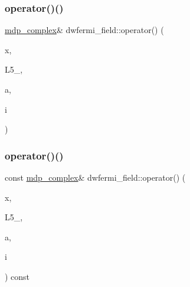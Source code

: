 \mbox{\label{classdwfermi__field_ac0d1e75f5248ce12c06e7fcb8add5948}} 
\subsubsection{\texorpdfstring{operator()()}{operator()()}\hspace{0.1cm}{\footnotesize\ttfamily [3/4]}}
{\footnotesize\ttfamily \hyperlink{classmdp__complex}{mdp\+\_\+complex}\& dwfermi\+\_\+field\+::operator() (\begin{DoxyParamCaption}\item[{\hyperlink{mdp__compatibility__macros_8h_aa6f1179c424e48adef1cedf7c436eb75}{site}}]{x,  }\item[{int}]{L5\+\_\+,  }\item[{int}]{a,  }\item[{int}]{i }\end{DoxyParamCaption})\hspace{0.3cm}{\ttfamily [inline]}}

\mbox{\label{classdwfermi__field_a9ffee5143dfce7c86b2be50915bc675f}} 
\subsubsection{\texorpdfstring{operator()()}{operator()()}\hspace{0.1cm}{\footnotesize\ttfamily [4/4]}}
{\footnotesize\ttfamily const \hyperlink{classmdp__complex}{mdp\+\_\+complex}\& dwfermi\+\_\+field\+::operator() (\begin{DoxyParamCaption}\item[{\hyperlink{mdp__compatibility__macros_8h_aa6f1179c424e48adef1cedf7c436eb75}{site}}]{x,  }\item[{int}]{L5\+\_\+,  }\item[{int}]{a,  }\item[{int}]{i }\end{DoxyParamCaption}) const\hspace{0.3cm}{\ttfamily [inline]}}

\mbox{\label{classdwfermi__field_a80684935337a1c336bd81379787ba9f4}} 
